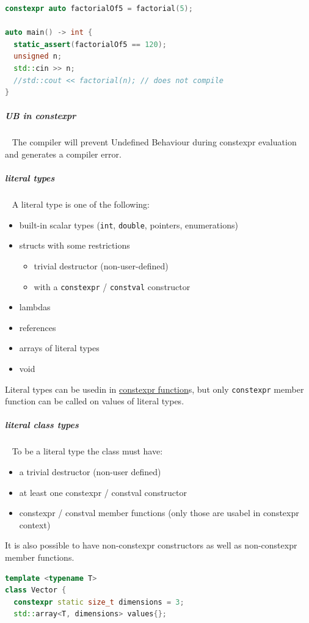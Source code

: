 \documentclass[11pt,twoside,landscape]{article}
\begin{document}
\begin{multicols}{2}
\begin{lstlisting}[language=c++,label=lst:consteval-example,caption={consteval example},captionpos=b,numbers=none]
constexpr auto factorialOf5 = factorial(5);

auto main() -> int {
  static_assert(factorialOf5 == 120);
  unsigned n;
  std::cin >> n;
  //std::cout << factorial(n); // does not compile
}
\end{lstlisting}

\subparagraph{UB in constexpr} \
\label{sec:orgf17a3ea}
The compiler will prevent Undefined Behaviour during constexpr evaluation and generates a compiler error.

\subparagraph{literal types} \
\label{sec:orgae5645b}
A literal type is one of the following:
\begin{itemize}
\item built-in scalar types (\texttt{int}, \texttt{double}, pointers, enumerations)
\item structs with some restrictions
\begin{itemize}
\item trivial destructor (non-user-defined)
\item with a \texttt{constexpr} / \texttt{constval} constructor
\end{itemize}
\item lambdas
\item references
\item arrays of literal types
\item void
\end{itemize}


Literal types can be usedin in \href{../../../roam/20230629095751-what_are_constexpr_functions_in_cpp.org}{constexpr function}s, but only \texttt{constexpr} member function can be called on values of literal types.

\subparagraph{literal class types} \
\label{sec:orga819e06}
To be a literal type the class must have:
\begin{itemize}
\item a trivial destructor (non-user defined)
\item at least one constexpr / constval constructor
\item constexpr / constval member functions (only those are usabel in constexpr context)
\end{itemize}


It is also possible to have non-constexpr constructors as well as non-constexpr member functions.

\begin{lstlisting}[language=c++,label=lst:example-for-a-literal-class-type,caption={Example for a literal class type},captionpos=b,numbers=none]
template <typename T>
class Vector {
  constexpr static size_t dimensions = 3;
  std::array<T, dimensions> values{};


\end{lstlisting}
\end{multicols}
\end{document}
